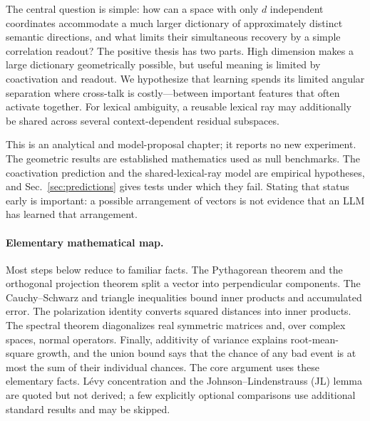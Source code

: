 \documentclass[
  aps,
  reprint,
  superscriptaddress,
  floatfix,
  nofootinbib,
  longbibliography
]{revtex4-2}
\begin{document}
The central question is simple: how can a space with only $d$ independent
coordinates accommodate a much larger dictionary of approximately distinct
semantic directions, and what limits their simultaneous recovery by a simple
correlation readout?
The positive thesis has two parts.  High dimension makes a large dictionary
geometrically possible, but useful meaning is limited by coactivation and
readout.  We hypothesize that learning spends its limited angular separation where
cross-talk is costly---between important features that often activate
together.  For lexical ambiguity, a reusable lexical ray may additionally be
shared across several context-dependent residual subspaces.

This is an analytical and model-proposal chapter; it reports no new experiment.
The geometric results are established mathematics used as null benchmarks.
The coactivation prediction and the shared-lexical-ray model are empirical
hypotheses, and Sec.~\ref{sec:predictions} gives tests under which they fail.
Stating that status early is important: a possible arrangement of vectors is
not evidence that an LLM has learned that arrangement.

\paragraph{Elementary mathematical map.}
Most steps below reduce to familiar facts.  The Pythagorean
theorem and the orthogonal projection theorem split a vector into perpendicular
components.  The Cauchy--Schwarz and triangle inequalities bound inner products
and accumulated error.  The polarization identity converts squared distances
into inner products.  The spectral theorem diagonalizes real symmetric
matrices and, over complex spaces, normal operators.  Finally, additivity of
variance explains root-mean-square growth,
and the union bound says that the chance of any bad event is at most the sum of
their individual chances.  The core argument uses these elementary facts.
L\'evy concentration and the Johnson--Lindenstrauss (JL) lemma are quoted but not derived;
a few explicitly optional comparisons use additional standard results and may
be skipped.
\end{document}
